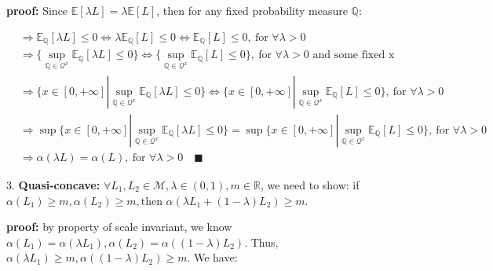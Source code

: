 \documentclass[letterpaper,11pt]{article}
\begin{document}
\begin{spacing}{1.2}
\textbf{proof: } Since $\mathbb{E}[\lambda L] = \lambda \mathbb{E}[L]$, then for any fixed probability measure $\mathbb{Q}: $

\begin{equation}
\begin{aligned}
&\Rightarrow \mathbb{E}_{\mathbb{Q}}[\lambda L] \le 0 \Leftrightarrow \lambda \mathbb{E}_{\mathbb{Q}}[L] \le 0 \Leftrightarrow \mathbb{E}_{\mathbb{Q}}[L] \le 0, \ \mbox{for } \forall \lambda > 0 \\
&\Rightarrow \{\sup_{\mathbb{Q} \in \mathcal{Q}^x} \mathbb{E}_{\mathbb{Q}}[\lambda L] \le 0\} \Leftrightarrow \{\sup_{\mathbb{Q} \in \mathcal{Q}^x} \mathbb{E}_{\mathbb{Q}}[L] \le 0\}, \ \mbox{for } \forall \lambda > 0 \mbox{ and some fixed x} \\
&\Rightarrow \Big \{x \in [0,+\infty] | \sup_{\mathbb{Q} \in \mathcal{Q}^x} \mathbb{E}_{\mathbb{Q}}[\lambda L] \le 0 \Big \} \Leftrightarrow \Big \{ x \in [0,+\infty] | \sup_{\mathbb{Q} \in \mathcal{Q}^x} \mathbb{E}_{\mathbb{Q}}[L] \le 0 \Big \}, \ \mbox{for } \forall \lambda > 0 \\
&\Rightarrow \sup \Big \{x \in [0,+\infty] | \sup_{\mathbb{Q} \in \mathcal{Q}^x} \mathbb{E}_{\mathbb{Q}}[\lambda L] \le 0 \Big \} = \sup \Big \{ x \in [0,+\infty] | \sup_{\mathbb{Q} \in \mathcal{Q}^x} \mathbb{E}_{\mathbb{Q}}[L] \le 0 \Big \}, \ \mbox{for } \forall \lambda > 0 \\
&\Rightarrow \alpha(\lambda L) = \alpha(L), \ \mbox{for } \forall \lambda > 0 \quad \blacksquare
\end{aligned}
\end{equation}

3. \textbf{Quasi-concave: }$\forall L_1, L_2 \in \mathcal{M}, \lambda \in (0,1), m \in \mathbb{R}$, we need to show: if $\alpha(L_1) \ge m, \alpha(L_2) \ge m, \mbox{then } \alpha(\lambda L_1 + (1-\lambda) L_2) \ge m$.

\textbf{proof: } by property of scale invariant, we know $\alpha(L_1) = \alpha(\lambda L_1), \alpha(L_2) = \alpha((1-\lambda) L_2)$. Thus, $\alpha(\lambda L_1) \ge m, \alpha((1-\lambda) L_2) \ge m$. We have:


\end{spacing}
\end{document}
